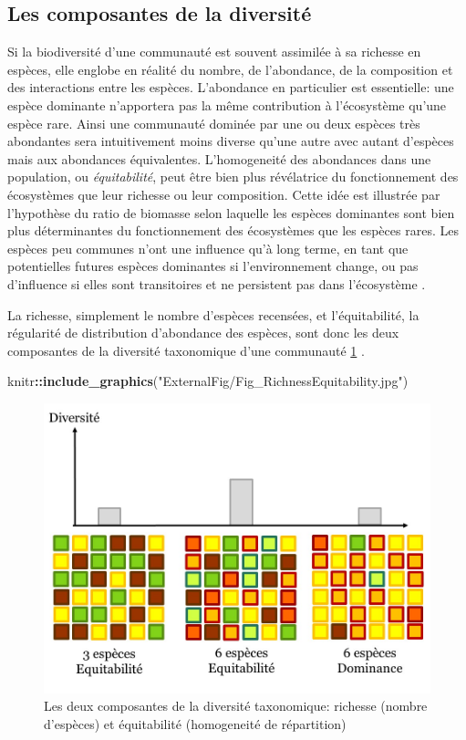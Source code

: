 \documentclass[
  11pt,
  french,
  A4paper,
  extrafontsizes,onecolumn,openright
  ]{memoir}
\newenvironment{Shaded}{\begin{snugshade}}{\end{snugshade}}
\newcommand{\KeywordTok}[1]{\textcolor[rgb]{0.13,0.29,0.53}{\textbf{#1}}}
\newcommand{\StringTok}[1]{\textcolor[rgb]{0.31,0.60,0.02}{#1}}
\newcommand{\OperatorTok}[1]{\textcolor[rgb]{0.81,0.36,0.00}{\textbf{#1}}}
\newcommand{\NormalTok}[1]{#1}
\begin{document}
\subsection{Les composantes de la
diversité}\label{les-composantes-de-la-diversite}

Si la biodiversité d'une communauté est souvent assimilée à sa richesse
en espèces, elle englobe en réalité du nombre, de l'abondance, de la
composition et des interactions entre les espèces. L'abondance en
particulier est essentielle: une espèce dominante n'apportera pas la
même contribution à l'écosystème qu'une espèce rare. Ainsi une
communauté dominée par une ou deux espèces très abondantes sera
intuitivement moins diverse qu'une autre avec autant d'espèces mais aux
abondances équivalentes. L'homogeneité des abondances dans une
population, ou \emph{équitabilité}, peut être bien plus révélatrice du
fonctionnement des écosystèmes que leur richesse ou leur composition.
Cette idée est illustrée par l'hypothèse du ratio de biomasse selon
laquelle les espèces dominantes sont bien plus déterminantes du
fonctionnement des écosystèmes que les espèces rares. Les espèces peu
communes n'ont une influence qu'à long terme, en tant que potentielles
futures espèces dominantes si l'environnement change, ou pas d'influence
si elles sont transitoires et ne persistent pas dans l'écosystème
\autocite{Grime1998}.

La richesse, simplement le nombre d'espèces recensées, et
l'équitabilité, la régularité de distribution d'abondance des espèces,
sont donc les deux composantes de la diversité taxonomique d'une
communauté \ref{fig:RichEqu} \autocites{Whittaker1965}{Magurran2004}.

\begin{Shaded}
\begin{Highlighting}[]
\NormalTok{knitr}\OperatorTok{::}\KeywordTok{include_graphics}\NormalTok{(}\StringTok{"ExternalFig/Fig_RichnessEquitability.jpg"}\NormalTok{)}
\end{Highlighting}
\end{Shaded}

\begin{figure}

{\centering \includegraphics[width=0.6\linewidth]{ExternalFig/Fig_RichnessEquitability} 

}

\caption{Les deux composantes de la diversité taxonomique: richesse (nombre d'espèces) et équitabilité (homogeneité de répartition)}\label{fig:RichEqu}
\end{figure}
\end{document}

